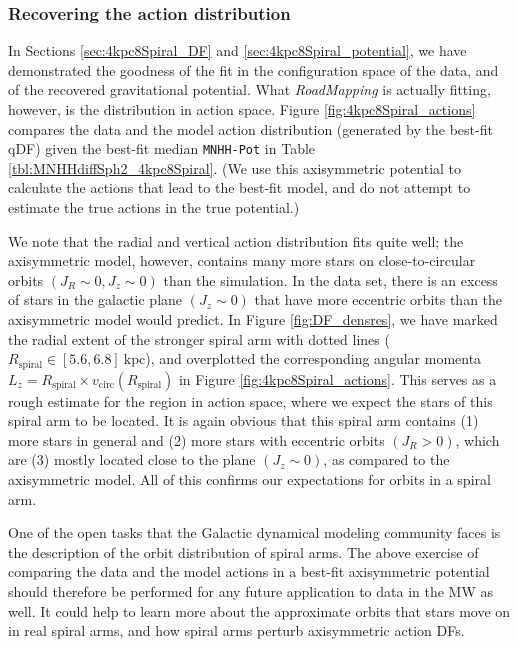 \documentclass[iop,revtex4,numberedappendix,appendixfloats]{emulateapj}
\newcommand{\RM}{{\sl RoadMapping}}
\begin{document}
\subsubsection{Recovering the action distribution} \label{sec:4kpc8Spiral_actions}

In Sections \ref{sec:4kpc8Spiral_DF} and \ref{sec:4kpc8Spiral_potential}, we have demonstrated the goodness of the fit in the configuration space of the data, and of the recovered gravitational potential. What \RM{} is actually fitting, however, is the distribution in action space. Figure \ref{fig:4kpc8Spiral_actions} compares the data and the model action distribution (generated by the best-fit qDF) given the best-fit median \texttt{MNHH-Pot} in Table \ref{tbl:MNHHdiffSph2_4kpc8Spiral}. (We use this axisymmetric potential to calculate the actions that lead to the best-fit model, and do not attempt to estimate the true actions in the true potential.)

We note that the radial and vertical action distribution fits quite well; the axisymmetric model, however, contains many more stars on close-to-circular orbits $(J_R \sim 0,J_z \sim 0)$ than the simulation. In the data set, there is an excess of stars in the galactic plane $(J_z\sim0)$ that have more eccentric orbits than the axisymmetric model would predict. In Figure \ref{fig:DF_densres}, we have marked the radial extent of the stronger spiral arm with dotted lines ($R_\text{spiral} \in [5.6,6.8]~\text{kpc}$), and overplotted the corresponding angular momenta $L_z = R_\text{spiral} \times v_\text{circ}(R_\text{spiral})$ in Figure \ref{fig:4kpc8Spiral_actions}. This serves as a rough estimate for the region in action space, where we expect the stars of this spiral arm to be located. It is again obvious that this spiral arm contains (1) more stars in general and (2) more stars with eccentric orbits $(J_R>0)$, which are (3) mostly located close to the plane $(J_z\sim0)$, as compared to the axisymmetric model. All of this confirms our expectations for orbits in a spiral arm. 

One of the open tasks that the Galactic dynamical modeling community faces is the description of the orbit distribution of spiral arms. The above exercise of comparing the data and the model actions in a best-fit axisymmetric potential should therefore be performed for any future application to data in the MW as well. It could help to learn more about the approximate orbits that stars move on in real spiral arms, and how spiral arms perturb axisymmetric action DFs.
\end{document}
